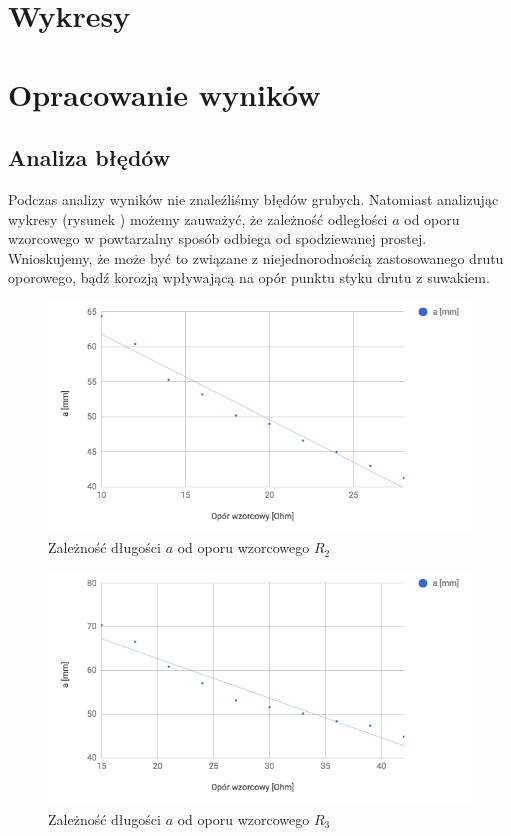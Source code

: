\documentclass[a4paper,10pt,twoside]{article}
\begin{document}
\section{Wykresy}

\section{Opracowanie wyników}

\subsection{Analiza błędów}

Podczas analizy wyników nie znaleźliśmy błędów grubych. Natomiast analizując wykresy (rysunek ) możemy zauważyć, że zależność odległości $a$ od oporu wzorcowego w powtarzalny sposób odbiega od spodziewanej prostej. Wnioskujemy, że może być to związane z niejednorodnością zastosowanego drutu oporowego, bądź korozją wpływającą na opór punktu styku drutu z suwakiem.

\begin{figure}[!htp]
\centerline{\includegraphics[scale=0.5]{wykres_r2.png}}
\caption{Zależność długości $a$ od oporu wzorcowego $R_2$}
\label{fig:wykres_r2}
\end{figure}

\begin{figure}[!htp]
\centerline{\includegraphics[scale=0.5]{wykres_r3.png}}
\caption{Zależność długości $a$ od oporu wzorcowego $R_3$}
\label{fig:wykres_r3}
\end{figure}
\end{document}
